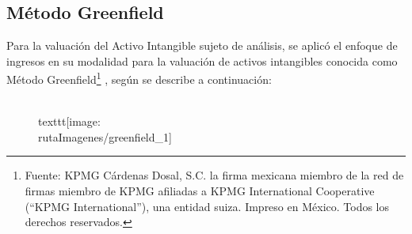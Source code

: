 \subsection{Método Greenfield}
Para la valuación del Activo Intangible sujeto de análisis, se aplicó el enfoque de ingresos en su modalidad para la valuación de activos intangibles conocida como \textcolor{principal}{Método Greenfield\footnote{Fuente: KPMG Cárdenas Dosal, S.C. la firma mexicana miembro de la red de firmas miembro de KPMG afiliadas a KPMG International Cooperative (``KPMG International''), una entidad suiza. Impreso en México. Todos los derechos reservados. }} , según se describe a continuación:


\begin{figure}[H]
\centering
\\texttt{[image: \\rutaImagenes/greenfield\_1]}\\

\end{figure}
